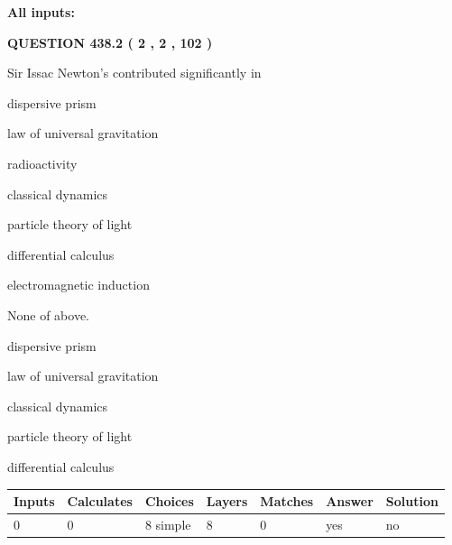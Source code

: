 \documentclass[12pt]{article}
\begin{document}
   
   
   
\noindent{}
   
   
   
   
\noindent\vspace{0.1in}\hspace{-0.08in} {\textbf{\Large{All inputs: }}}
   
   
  
\vspace{0.2in}
  
{\textbf{\Large{QUESTION
438.2 
 ( 2 , 2 , 102 )
}}}
  
  
Sir Issac Newton's contributed significantly in
 
 
dispersive prism
 
 
law of universal gravitation
 
 
radioactivity
 
 
classical dynamics
 
 
particle theory of light
 
 
differential calculus
 
 
electromagnetic induction
 
 
 None of above.
 
 
\noindent{}
 
 
dispersive prism
 
 
law of universal gravitation
 
 
classical dynamics
 
 
particle theory of light
 
 
differential calculus
 
 
\noindent{}
 
 
   
   
   
   
\noindent\begin{tabular}{|l|l|l|l|l|l|l|}
 \hline
Inputs & Calculates & Choices & Layers & Matches & Answer & Solution \\ \hline
 0  & 
 0  & 
 8
  simple  
  & 
 8  & 
 0  & 
  yes & 
  no 
  \\ \hline
 \end{tabular}
   
\end{document}
